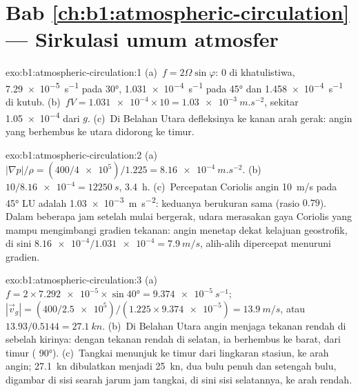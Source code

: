 \section*{Bab \ref{ch:b1:atmospheric-circulation} --- Sirkulasi umum atmosfer}

\begin{solution}{exo:b1:atmospheric-circulation:1}
(a)~$f = 2\Omega\sin\varphi$: $0$ di khatulistiwa, \qty{7.29e-5}{s^{-1}} pada \ang{30},
\qty{1.031e-4}{s^{-1}} pada \ang{45} dan \qty{1.458e-4}{s^{-1}} di kutub.
(b)~$fV = \num{1.031e-4} \times 10 = \qty{1.03e-3}{m.s^{-2}}$, sekitar \num{1.05e-4}
dari $g$. (c)~Di Belahan Utara defleksinya ke kanan arah gerak: angin yang berhembus ke utara
didorong ke timur.
\end{solution}

\begin{solution}{exo:b1:atmospheric-circulation:2}
(a)~$|\nabla p|/\rho = (400/\num{4e5})/1.225 = \qty{8.16e-4}{m.s^{-2}}$.
(b)~$10/\num{8.16e-4} = \qty{12250}{s}$, \qty{3.4}{h}. (c)~Percepatan Coriolis
angin \qty{10}{m/s} pada \ang{45} LU adalah \qty{1.03e-3}{m.s^{-2}}: keduanya berukuran
sama (rasio $0.79$). Dalam beberapa jam setelah mulai bergerak, udara merasakan gaya Coriolis yang mampu
mengimbangi gradien tekanan: angin menetap dekat kelajuan geostrofik, di sini
$\num{8.16e-4}/\num{1.031e-4} = \qty{7.9}{m/s}$, alih-alih
dipercepat menuruni gradien.
\end{solution}

\begin{solution}{exo:b1:atmospheric-circulation:3}
(a)~$f = 2 \times \num{7.292e-5} \times \sin\ang{40} = \qty{9.374e-5}{s^{-1}}$;
$|\vec v_g| = (400/\num{2.5e5})/(1.225 \times \num{9.374e-5}) = \qty{13.9}{m/s}$, atau
$13.93/0.5144 = \qty{27.1}{kn}$. (b)~Di Belahan Utara angin menjaga tekanan rendah di sebelah kirinya: dengan tekanan rendah di selatan, ia berhembus ke barat, dari timur
( \ang{90}). (c)~Tangkai menunjuk ke timur dari lingkaran stasiun, ke arah angin;
\qty{27.1}{kn} dibulatkan menjadi \qty{25}{kn}, dua bulu penuh dan setengah bulu, digambar di sisi searah jarum jam tangkai, di sini sisi selatannya, ke arah rendah.
\end{solution}

